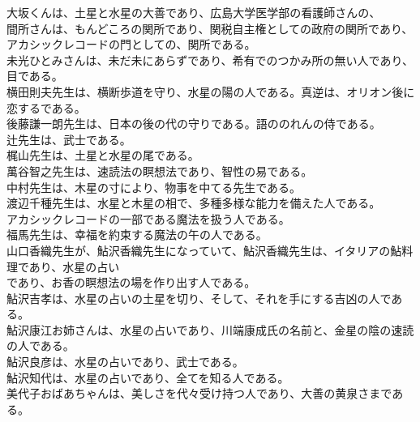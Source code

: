 \documentclass{jsarticle}
\begin{document}
大坂くんは、土星と水星の大善であり、広島大学医学部の看護師さんの、\\
間所さんは、もんどころの関所であり、関税自主権としての政府の関所であり、\\
アカシックレコードの門としての、関所である。\\
未光ひとみさんは、未だ未にあらずであり、希有でのつかみ所の無い人であり、目である。\\
横田則夫先生は、横断歩道を守り、水星の陽の人である。真逆は、オリオン後に恋するである。\\
後藤謙一朗先生は、日本の後の代の守りである。語ののれんの侍である。\\
辻先生は、武士である。\\
梶山先生は、土星と水星の尾である。\\
萬谷智之先生は、速読法の瞑想法であり、智性の易である。\\
中村先生は、木星の寸により、物事を中てる先生である。\\
渡辺千種先生は、水星と木星の相で、多種多様な能力を備えた人である。\\
アカシックレコードの一部である魔法を扱う人である。\\
福馬先生は、幸福を約束する魔法の午の人である。\\
山口香織先生が、鮎沢香織先生になっていて、鮎沢香織先生は、イタリアの鮎料理であり、水星の占い\\
であり、お香の瞑想法の場を作り出す人である。\\
鮎沢吉孝は、水星の占いの土星を切り、そして、それを手にする吉凶の人である。\\
鮎沢康江お姉さんは、水星の占いであり、川端康成氏の名前と、金星の陰の速読の人である。\\
鮎沢良彦は、水星の占いであり、武士である。\\
鮎沢知代は、水星の占いであり、全てを知る人である。\\
美代子おばあちゃんは、美しさを代々受け持つ人であり、大善の黄泉さまである。\\
\end{document}
